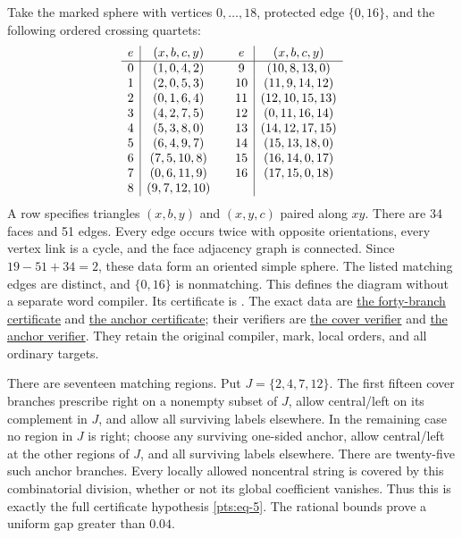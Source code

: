 Take the marked sphere with vertices $0,\ldots,18$, protected edge
$\{0,16\}$, and the following ordered crossing quartets:
\begin{equation}\label{pts:eq-28}
\begin{array}{c|c@{\qquad}c|c}
e&(x,b,c,y)&e&(x,b,c,y)\\ \hline
0&(1,0,4,2)&9&(10,8,13,0)\\
1&(2,0,5,3)&10&(11,9,14,12)\\
2&(0,1,6,4)&11&(12,10,15,13)\\
3&(4,2,7,5)&12&(0,11,16,14)\\
4&(5,3,8,0)&13&(14,12,17,15)\\
5&(6,4,9,7)&14&(15,13,18,0)\\
6&(7,5,10,8)&15&(16,14,0,17)\\
7&(0,6,11,9)&16&(17,15,0,18)\\
8&(9,7,12,10)&&
\end{array}
\end{equation}
A row specifies triangles $(x,b,y)$ and $(x,y,c)$ paired along $xy$.
There are 34 faces and 51 edges. Every edge occurs twice with opposite
orientations, every vertex link is a cycle, and the face adjacency graph
is connected. Since $19-51+34=2$, these data form an oriented simple
sphere. The listed matching edges are distinct, and $\{0,16\}$ is
nonmatching. This defines the diagram without a separate word compiler.
Its certificate is \cite[Theorem 6.1]{PlanarCertificates}.
The exact data are
\href{https://github.com/sashakolpakov/murakamis_dream/blob/main/experiments/actual_sector_cover_certificate.json}{the
forty-branch certificate} and
\href{https://github.com/sashakolpakov/murakamis_dream/blob/main/experiments/actual_shared_radius_anchor_obstruction_certificate.json}{the
anchor certificate}; their verifiers are
\href{https://github.com/sashakolpakov/murakamis_dream/blob/main/experiments/audit_actual_sector_cover.py}{the cover verifier}
and
\href{https://github.com/sashakolpakov/murakamis_dream/blob/main/experiments/audit_actual_shared_radius_anchor_obstruction.py}{the
anchor verifier}. They retain the original compiler, mark, local orders,
and all ordinary targets.

There are seventeen matching regions. Put \(J=\{2,4,7,12\}\). The first
fifteen cover branches prescribe right on a nonempty subset of \(J\),
allow central/left on its complement in \(J\), and allow all surviving
labels elsewhere. In the remaining case no region in \(J\) is right;
choose any surviving one-sided anchor, allow central/left at the other
regions of \(J\), and all surviving labels elsewhere. There are
twenty-five such anchor branches. Every locally allowed noncentral
string is covered by this combinatorial division, whether or not its
global coefficient vanishes. Thus this is exactly the full certificate
hypothesis \eqref{pts:eq-5}. The rational bounds prove a uniform gap greater than
\(0.04\).

